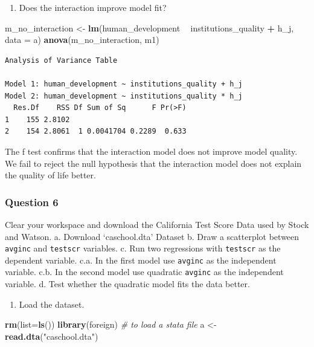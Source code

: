 \documentclass[]{article}
\newenvironment{Shaded}{\begin{snugshade}}{\end{snugshade}}
\newcommand{\KeywordTok}[1]{\textcolor[rgb]{0.13,0.29,0.53}{\textbf{#1}}}
\newcommand{\DataTypeTok}[1]{\textcolor[rgb]{0.13,0.29,0.53}{#1}}
\newcommand{\StringTok}[1]{\textcolor[rgb]{0.31,0.60,0.02}{#1}}
\newcommand{\CommentTok}[1]{\textcolor[rgb]{0.56,0.35,0.01}{\textit{#1}}}
\newcommand{\OperatorTok}[1]{\textcolor[rgb]{0.81,0.36,0.00}{\textbf{#1}}}
\newcommand{\NormalTok}[1]{#1}
\providecommand{\tightlist}{%
  \setlength{\itemsep}{0pt}\setlength{\parskip}{0pt}}
\theoremstyle{definition}
\theoremstyle{definition}
\theoremstyle{definition}
\theoremstyle{remark}
\begin{document}
\begin{enumerate}
\def\labelenumi{\alph{enumi}.}
\setcounter{enumi}{3}
\tightlist
\item
  Does the interaction improve model fit?
\end{enumerate}

\begin{Shaded}
\begin{Highlighting}[]
\NormalTok{m_no_interaction <-}\StringTok{ }\KeywordTok{lm}\NormalTok{(human_development }\OperatorTok{~}\StringTok{ }\NormalTok{institutions_quality }\OperatorTok{+}\StringTok{ }\NormalTok{h_j, }\DataTypeTok{data =}\NormalTok{ a)}
\KeywordTok{anova}\NormalTok{(m_no_interaction, m1)}
\end{Highlighting}
\end{Shaded}

\begin{verbatim}
Analysis of Variance Table

Model 1: human_development ~ institutions_quality + h_j
Model 2: human_development ~ institutions_quality * h_j
  Res.Df    RSS Df Sum of Sq      F Pr(>F)
1    155 2.8102                           
2    154 2.8061  1 0.0041704 0.2289  0.633
\end{verbatim}

The f test confirms that the interaction model does not improve model
quality. We fail to reject the null hypothesis that the interaction
model does not explain the quality of life better.

\subsubsection{Question 6}\label{question-6}

Clear your workspace and download the California Test Score Data used by
Stock and Watson. a. Download `caschool.dta' Dataset b. Draw a
scatterplot between \texttt{avginc} and \texttt{testscr} variables. c.
Run two regressions with \texttt{testscr} as the dependent variable.
c.a. In the first model use \texttt{avginc} as the independent variable.
c.b. In the second model use quadratic \texttt{avginc} as the
independent variable. d. Test whether the quadratic model fits the data
better.

\begin{enumerate}
\def\labelenumi{\alph{enumi}.}
\tightlist
\item
  Load the dataset.
\end{enumerate}

\begin{Shaded}
\begin{Highlighting}[]
\KeywordTok{rm}\NormalTok{(}\DataTypeTok{list=}\KeywordTok{ls}\NormalTok{())}
\KeywordTok{library}\NormalTok{(foreign) }\CommentTok{# to load a stata file}
\NormalTok{a <-}\StringTok{ }\KeywordTok{read.dta}\NormalTok{(}\StringTok{"caschool.dta"}\NormalTok{)}
\end{Highlighting}
\end{Shaded}
\end{document}
